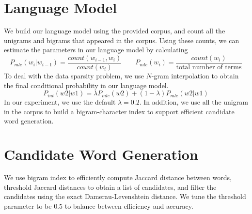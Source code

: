 
\usepackage{graphicx,amssymb,amsmath,enumerate}
\usepackage{courier}
\usepackage{color}
\usepackage{listings}
\usepackage{fancyvrb}
\usepackage{stmaryrd}

\oddsidemargin 0in
\evensidemargin 0in
\textwidth 6.5in
\topmargin -0.5in
\textheight 9.0in




\pagestyle{myheadings}  %

\section{Language Model}
We build our language model using the provided corpus, and count all the unigrams and bigrams that appeared in the corpus.
Using these counts, we can estimate the parameters in our language model by calculating
\begin{equation}\label{eq:1}
P_{mle}(w_i | w_{i-1}) = \frac{count(w_{i-1}, w_i)}{count(w_i)}
\qquad
P_{mle}(w_i) = \frac{count(w_i)}{\textrm{total number of terms}}
\end{equation}
To deal with the data sparsity problem, we use $N$-gram interpolation to obtain the final conditional probability in our language model.
\begin{equation}\label{eq:2}
P_{int}(w2 | w1) = \lambda P_{mle}(w2) + (1 - \lambda)P_{mle}(w2|w1)
\end{equation}
In our experiment, we use the default $\lambda = 0.2$.
In addition, we use all the unigram in the corpus to build a bigram-character index to support efficient candidate word generation.

\section{Candidate Word Generation}
We use bigram index to efficiently compute Jaccard distance between words, threshold Jaccard distances to obtain a list of candidates, and filter the candidates using the exact Damerau-Levenshtein distance.
We tune the threshold parameter to be $0.5$ to balance between efficiency and accuracy.

